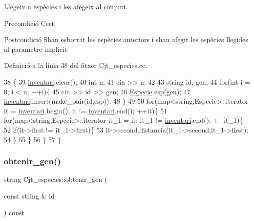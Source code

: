 Llegeix n espècies i les afegeix al conjunt. 

\begin{DoxyPrecond}{Precondició}
Cert 
\end{DoxyPrecond}
\begin{DoxyPostcond}{Postcondició}
S\textquotesingle{}han esborrat les espècies anteriors i s\textquotesingle{}han afegit les espècies llegides al parametre implícit 
\end{DoxyPostcond}


Definició a la línia 38 del fitxer Cjt\+\_\+especies.\+cc.


\begin{DoxyCode}
38                                       \{
39     \hyperlink{class_cjt__especies_aa253bc335c8c8176b8ece5c49a15c5f3}{inventari}.clear();
40     \textcolor{keywordtype}{int} n;
41     cin >> n;
42 
43     \textcolor{keywordtype}{string} id, gen;
44     \textcolor{keywordflow}{for}(\textcolor{keywordtype}{int} i = 0; i < n; ++i)\{
45         cin >> \textcolor{keywordtype}{id} >> gen;
46         \hyperlink{class_especie}{Especie} esp(gen);
47         \hyperlink{class_cjt__especies_aa253bc335c8c8176b8ece5c49a15c5f3}{inventari}.insert(make\_pair(\textcolor{keywordtype}{id},esp));
48     \}
49 
50     \textcolor{keywordflow}{for}(map<string,Especie>::iterator it = \hyperlink{class_cjt__especies_aa253bc335c8c8176b8ece5c49a15c5f3}{inventari}.begin(); it != 
      \hyperlink{class_cjt__especies_aa253bc335c8c8176b8ece5c49a15c5f3}{inventari}.end(); ++it)\{
51         \textcolor{keywordflow}{for}(map<string,Especie>::iterator it\_1 = it; it\_1 != \hyperlink{class_cjt__especies_aa253bc335c8c8176b8ece5c49a15c5f3}{inventari}.end(); ++it\_1)\{
52             \textcolor{keywordflow}{if}(it->first != it\_1->first)\{
53                 it->second.distancia(it\_1->second,it\_1->first);
54             \}
55         \}
56     \}
57 \}
\end{DoxyCode}
\mbox{\label{class_cjt__especies_ae6c9a86512b2ed7686741459167b68c9}} 
\subsubsection{\texorpdfstring{obtenir\+\_\+gen()}{obtenir\_gen()}}
{\footnotesize\ttfamily string Cjt\+\_\+especies\+::obtenir\+\_\+gen (\begin{DoxyParamCaption}\item[{const string \&}]{id }\end{DoxyParamCaption}) const}



